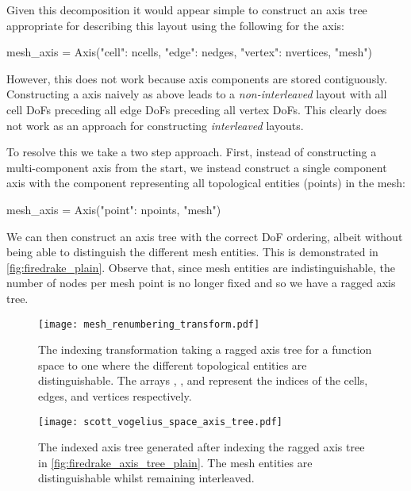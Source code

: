 \documentclass[thesis]{subfiles}
\begin{document}
Given this decomposition it would appear simple to construct an axis tree appropriate for describing this layout using the following for the  axis:
\begin{pyinline}
  mesh_axis = Axis({"cell": ncells,
                    "edge": nedges,
                    "vertex": nvertices}, "mesh")
\end{pyinline}
However, this does not work because axis components are stored contiguously.
Constructing a  axis naively as above leads to a \emph{non-interleaved} layout with all cell DoFs preceding all edge DoFs preceding all vertex DoFs.
This clearly does not work as an approach for constructing \emph{interleaved} layouts.

To resolve this we take a two step approach.
First, instead of constructing a multi-component  axis from the start, we instead construct a single component axis with the component representing all topological entities (points) in the mesh:
\begin{pyinline}
  mesh_axis = Axis({"point": npoints}, "mesh")
\end{pyinline}
We can then construct an axis tree with the correct DoF ordering, albeit without being able to distinguish the different mesh entities.
This is demonstrated in \cref{fig:firedrake_plain}.
Observe that, since mesh entities are indistinguishable, the number of nodes per mesh point is no longer fixed and so we have a ragged axis tree.

\begin{landscape}

\begin{figure}
  \centering
  \texttt{[image: mesh\_renumbering\_transform.pdf]}
  \caption{
    The indexing transformation taking a ragged axis tree for a function space to one where the different topological entities are distinguishable.
    The arrays \pycode{[0,3,...]}, \pycode{[2,...]}, and \pycode{[1,4,...]} represent the indices of the cells, edges, and vertices respectively.
  }
  \label{fig:mesh_renumbering_transform}
\end{figure}

\begin{figure}
  \centering
  \texttt{[image: scott\_vogelius\_space\_axis\_tree.pdf]}
  \caption{
    The indexed axis tree generated after indexing the ragged axis tree in \cref{fig:firedrake_axis_tree_plain}.
    The mesh entities are distinguishable whilst remaining interleaved.
  }
  \label{fig:firedrake_axis_tree}
\end{figure}

\end{landscape}
\end{document}
